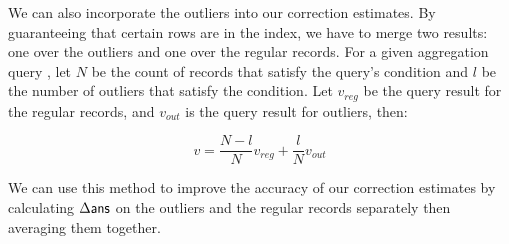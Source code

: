 We can also incorporate the outliers into our correction estimates.  
By guaranteeing that certain rows are in the index, we
have to merge two results: one over the outliers and one over the regular records.
For a given aggregation query , let $N$ be the count of records that satisfy the query's condition and $l$ be the number of outliers that satisfy the condition.
Let $v_{reg}$ be the query result for the regular records, and $v_{out}$ is the query result for outliers, then:

\[
 v = \frac{N-l}{N}v_{reg} + \frac{l}{N}v_{out}
\]

We can use this method to improve the accuracy of our correction estimates by calculating $\Delta\textsf{ans}$ 
on the outliers and the regular records separately then averaging them together. 
